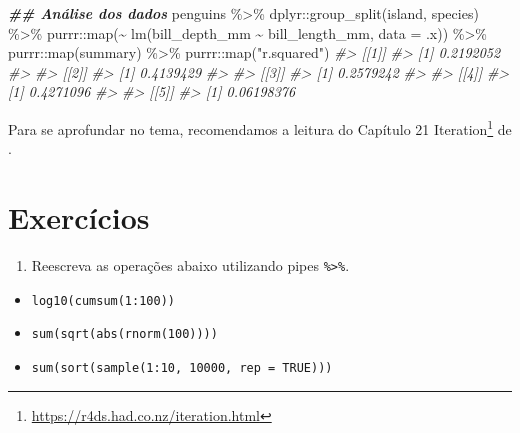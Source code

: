 \documentclass[
]{book}
\newenvironment{Shaded}{\begin{snugshade}}{\end{snugshade}}
\newcommand{\AttributeTok}[1]{\textcolor[rgb]{0.61,0.61,0.61}{#1}}
\newcommand{\CommentTok}[1]{\textcolor[rgb]{0.37,0.37,0.37}{\textit{#1}}}
\newcommand{\DocumentationTok}[1]{\textcolor[rgb]{0.37,0.37,0.37}{\textbf{\textit{#1}}}}
\newcommand{\FunctionTok}[1]{\textcolor[rgb]{0,0,0}{#1}}
\newcommand{\NormalTok}[1]{#1}
\newcommand{\SpecialCharTok}[1]{\textcolor[rgb]{0,0,0}{#1}}
\newcommand{\StringTok}[1]{\textcolor[rgb]{0.5,0.5,0.5}{#1}}
\providecommand{\tightlist}{%
  \setlength{\itemsep}{0pt}\setlength{\parskip}{0pt}}
\renewcommand{\href}[2]{#2\footnote{\url{#1}}}
\begin{document}
\begin{Shaded}
\begin{Highlighting}[]
\DocumentationTok{\#\# Análise dos dados}
\NormalTok{penguins }\SpecialCharTok{\%\textgreater{}\%}
\NormalTok{  dplyr}\SpecialCharTok{::}\FunctionTok{group\_split}\NormalTok{(island, species) }\SpecialCharTok{\%\textgreater{}\%} 
\NormalTok{  purrr}\SpecialCharTok{::}\FunctionTok{map}\NormalTok{(}\SpecialCharTok{\textasciitilde{}} \FunctionTok{lm}\NormalTok{(bill\_depth\_mm }\SpecialCharTok{\textasciitilde{}}\NormalTok{ bill\_length\_mm, }\AttributeTok{data =}\NormalTok{ .x)) }\SpecialCharTok{\%\textgreater{}\%} 
\NormalTok{  purrr}\SpecialCharTok{::}\FunctionTok{map}\NormalTok{(summary) }\SpecialCharTok{\%\textgreater{}\%} 
\NormalTok{  purrr}\SpecialCharTok{::}\FunctionTok{map}\NormalTok{(}\StringTok{"r.squared"}\NormalTok{)}
\CommentTok{\#\textgreater{} [[1]]}
\CommentTok{\#\textgreater{} [1] 0.2192052}
\CommentTok{\#\textgreater{} }
\CommentTok{\#\textgreater{} [[2]]}
\CommentTok{\#\textgreater{} [1] 0.4139429}
\CommentTok{\#\textgreater{} }
\CommentTok{\#\textgreater{} [[3]]}
\CommentTok{\#\textgreater{} [1] 0.2579242}
\CommentTok{\#\textgreater{} }
\CommentTok{\#\textgreater{} [[4]]}
\CommentTok{\#\textgreater{} [1] 0.4271096}
\CommentTok{\#\textgreater{} }
\CommentTok{\#\textgreater{} [[5]]}
\CommentTok{\#\textgreater{} [1] 0.06198376}
\end{Highlighting}
\end{Shaded}

Para se aprofundar no tema, recomendamos a leitura do Capítulo \href{https://r4ds.had.co.nz/iteration.html}{21 Iteration} de \citet{wickham2017}.

\hypertarget{exercuxedcios-1}{%
\section{Exercícios}\label{exercuxedcios-1}}

\begin{enumerate}
\def\labelenumi{\arabic{enumi}.}
\tightlist
\item
  Reescreva as operações abaixo utilizando pipes \texttt{\%\textgreater{}\%}.
\end{enumerate}

\begin{itemize}
\tightlist
\item
  \texttt{log10(cumsum(1:100))}
\item
  \texttt{sum(sqrt(abs(rnorm(100))))}
\item
  \texttt{sum(sort(sample(1:10,\ 10000,\ rep\ =\ TRUE)))}
\end{itemize}
\end{document}
